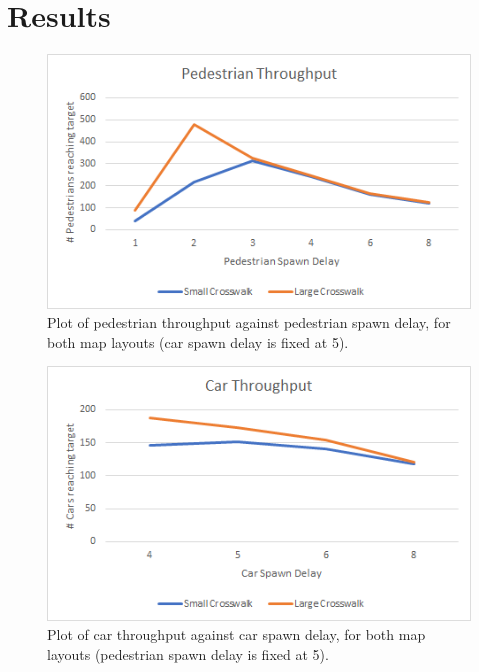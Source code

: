 \chapter{Results} \label{chap:results}


\begin{figure}
    \label{fig:plot-pedestrian-throughput}
    \centering
    \includegraphics[width=4.5in]{images/plot-pedestrian-throughput.png}
    \caption{Plot of pedestrian throughput against pedestrian spawn delay, for both map layouts (car spawn delay is fixed at 5).}
\end{figure}

\begin{figure}
    \label{fig:plot-car-throughput}
    \centering
    \includegraphics[width=4.5in]{images/plot-car-throughput.png}
    \caption{Plot of car throughput against car spawn delay, for both map layouts (pedestrian spawn delay is fixed at 5).}
\end{figure}


